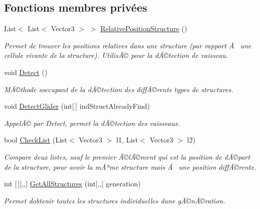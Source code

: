 \subsection*{Fonctions membres privées}
\begin{DoxyCompactItemize}
\item 
List$<$ List$<$ Vector3 $>$ $>$ \mbox{\hyperlink{class_detection_a168b07e1ffdca2d91d8c5e251a470a25}{Relative\+Position\+Structure}} ()
\begin{DoxyCompactList}\small\item\em Permet de trouver les positions relatives dans une structure (par rapport Ã  une cellule vivante de la structure). UtilisÃ© pour la dÃ©tection de vaisseau. \end{DoxyCompactList}\item 
void \mbox{\hyperlink{class_detection_a2d43ae8dc03c4247fd0d39787b72213a}{Detect}} ()
\begin{DoxyCompactList}\small\item\em MÃ©thode s\textquotesingle{}occupant de la dÃ©tection des diffÃ©rents types de structures. \end{DoxyCompactList}\item 
void \mbox{\hyperlink{class_detection_a88c0afc7566ffe8ac32fe1c21da192df}{Detect\+Glider}} (int\mbox{[}$\,$\mbox{]} ind\+Struct\+Already\+Find)
\begin{DoxyCompactList}\small\item\em AppelÃ© par Detect, permet la dÃ©tection des vaisseaux. \end{DoxyCompactList}\item 
bool \mbox{\hyperlink{class_detection_a2d8aeb536aa1051f0522f8317b14b36e}{Check\+List}} (List$<$ Vector3 $>$ l1, List$<$ Vector3 $>$ l2)
\begin{DoxyCompactList}\small\item\em Compare deux listes, sauf le premier Ã©lÃ©ment qui est la position de dÃ©part de la structure, pour avoir la mÃªme structure mais Ã  une position diffÃ©rente. \end{DoxyCompactList}\item 
int \mbox{[}$\,$\mbox{]}\mbox{[},,\mbox{]} \mbox{\hyperlink{class_detection_a56dffa1e7a06c20bfaa24ac287a9883f}{Get\+All\+Structures}} (int\mbox{[},,\mbox{]} generation)
\begin{DoxyCompactList}\small\item\em Permet d\textquotesingle{}obtenir toutes les structures individuelles d\textquotesingle{}une gÃ©nÃ©ration. \end{DoxyCompactList}\item 

\end{DoxyCompactItemize}

